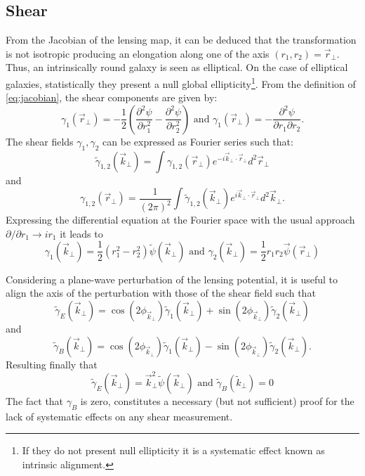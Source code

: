 \subsection{Shear}
From the Jacobian of the lensing map, it can be deduced that the transformation is not isotropic producing an elongation along one of the axis $(r_1,r_2) = \vec r_\perp$. Thus, an intrinsically round galaxy is seen as elliptical. On the case of elliptical galaxies, statistically they present a null global ellipticity\footnote{If they do not present null ellipticity it is a systematic effect known as intrinsic alignment.}. From the definition of \autoref{eq:jacobian}, the shear components are given by:
\begin{equation}
\gamma_1(\vec r_\perp) = -\frac{1}{2}\left(\frac{\partial^2\psi}{\partial r_1^2}-\frac{\partial^2\psi}{\partial r_2^2}\right)\mbox{ and }\gamma_1(\vec r_\perp) = -\frac{\partial^2\psi}{\partial r_1\partial r_2}.
\end{equation}
The shear fields $\gamma_1,\gamma_2$ can be expressed as Fourier series such that:
\begin{equation}
\tilde \gamma_{1,2}(\vec k_\perp) = \int \gamma_{1,2}(\vec r_\perp)e^{-i\vec k_\perp\cdot\vec r_\perp}d^2\vec r_\perp
\end{equation}
and
\begin{equation}
\gamma_{1,2}(\vec r_\perp) = \frac{1}{(2\pi)^2}\int \tilde\gamma_{1,2}(\vec k_\perp)e^{i\vec k_\perp\cdot\vec r_\perp}d^2\vec k_\perp.
\end{equation}
Expressing the differential equation at the Fourier space with the usual approach $\partial/\partial r_1\rightarrow ir_1$ it leads to
\begin{equation}
\gamma_1(\vec k_\perp) = \frac{1}{2}(r_1^2-r_2^2)\tilde\psi(\vec k_\perp)\mbox{ and }\gamma_2(\vec k_\perp) = \frac{1}{2}r_1r_2\vec \psi(\vec r_\perp)
\end{equation}

Considering a plane-wave perturbation of the lensing potential, it is useful to align the axis of the perturbation with those of the shear field such that
\begin{equation}
\tilde \gamma_E(\vec k_\perp) = \cos(2\phi_{\vec k_\perp})\tilde \gamma_1(\vec k_\perp)+\sin(2\phi_{\vec k_\perp})\tilde \gamma_2(\vec k_\perp)
\end{equation}
and
\begin{equation}
\tilde \gamma_B(\vec k_\perp) = \cos(2\phi_{\vec k_\perp})\tilde \gamma_1(\vec k_\perp)-\sin(2\phi_{\vec k_\perp})\tilde \gamma_2(\vec k_\perp).
\end{equation}
Resulting finally that
\begin{equation}
\tilde\gamma_E(\vec k_\perp) = \vec k_\perp^2\tilde\psi(\vec k_\perp)\mbox{ and }\tilde\gamma_B(\tilde k_\perp) = 0
\end{equation}
The fact that $\gamma_B$ is zero, constitutes a necessary (but not sufficient) proof for the lack of systematic effects on any shear measurement.
\newline

